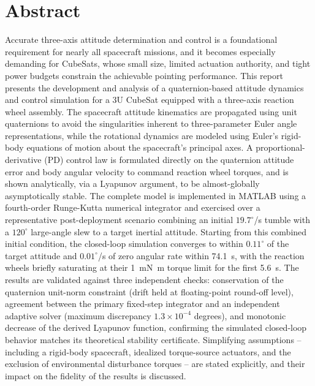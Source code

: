 \section*{Abstract}

Accurate three-axis attitude determination and control is a foundational requirement for nearly all spacecraft missions, and it becomes especially demanding for CubeSats, whose small size, limited actuation authority, and tight power budgets constrain the achievable pointing performance. This report presents the development and analysis of a quaternion-based attitude dynamics and control simulation for a 3U CubeSat equipped with a three-axis reaction wheel assembly. The spacecraft attitude kinematics are propagated using unit quaternions to avoid the singularities inherent to three-parameter Euler angle representations, while the rotational dynamics are modeled using Euler's rigid-body equations of motion about the spacecraft's principal axes. A proportional-derivative (PD) control law is formulated directly on the quaternion attitude error and body angular velocity to command reaction wheel torques, and is shown analytically, via a Lyapunov argument, to be almost-globally asymptotically stable. The complete model is implemented in MATLAB using a fourth-order Runge-Kutta numerical integrator and exercised over a representative post-deployment scenario combining an initial $19.7^\circ$/s tumble with a $120^\circ$ large-angle slew to a target inertial attitude. Starting from this combined initial condition, the closed-loop simulation converges to within $0.11^\circ$ of the target attitude and $0.01^\circ$/s of zero angular rate within \SI{74.1}{\second}, with the reaction wheels briefly saturating at their \SI{1}{\milli\newton\meter} torque limit for the first \SI{5.6}{\second}. The results are validated against three independent checks: conservation of the quaternion unit-norm constraint (drift held at floating-point round-off level), agreement between the primary fixed-step integrator and an independent adaptive solver (maximum discrepancy $1.3\times10^{-4}$ degrees), and monotonic decrease of the derived Lyapunov function, confirming the simulated closed-loop behavior matches its theoretical stability certificate. Simplifying assumptions -- including a rigid-body spacecraft, idealized torque-source actuators, and the exclusion of environmental disturbance torques -- are stated explicitly, and their impact on the fidelity of the results is discussed.

\clearpage
